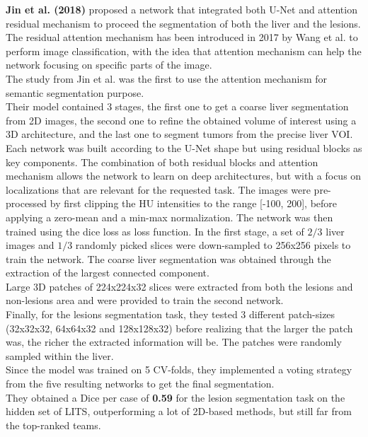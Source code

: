 \textbf{Jin et al. (2018)} proposed a network that integrated both U-Net
and attention residual mechanism to proceed the segmentation of both the
liver and the lesions.\\
The residual attention mechanism has been introduced in 2017 by
Wang et al. \cite{Wang2017}
to perform image classification, with the idea that attention mechanism
can help the network focusing on specific parts of the image.\\
The study from Jin et al. was the first to use the attention mechanism
for semantic segmentation purpose.\\
Their model contained 3 stages, the first one to get a coarse liver
segmentation from 2D images, the second one to refine the obtained
volume of interest using a 3D architecture, and the last one to segment
tumors from the precise liver VOI.\\
Each network was built according to the U-Net shape but using residual
blocks as key components. The combination of both residual blocks and
attention mechanism allows the network to learn on deep architectures,
but with a focus on localizations that are relevant for the requested
task.
The images were pre-processed by first clipping the HU intensities to
the range {[}-100, 200{]}, before applying a zero-mean and a min-max
normalization. The network was then trained using the dice loss as loss
function.
In the first stage, a set of $2/3$ liver images and $1/3$ randomly picked slices
were down-sampled to 256x256 pixels to train the network. The coarse
liver segmentation was obtained through the extraction of the largest
connected component.\\
Large 3D patches of 224x224x32 slices were extracted from both the
lesions and non-lesions area and were provided to train the second
network.\\
Finally, for the lesions segmentation task, they tested 3 different
patch-sizes (32x32x32, 64x64x32 and 128x128x32) before realizing that
the larger the patch was, the richer the extracted information will be.
The patches were randomly sampled within the liver.\\
Since the model was trained on 5 CV-folds, they implemented a voting
strategy from the five resulting networks to get the final segmentation.\\
They obtained a Dice per case of \textbf{0.59} for the lesion
segmentation task on the hidden set of LITS, outperforming a lot of
2D-based methods, but still far from the top-ranked teams.
